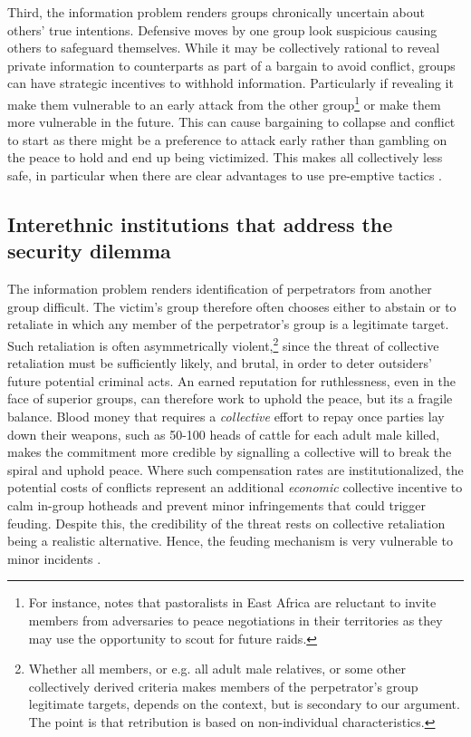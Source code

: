 Third, the information problem renders groups chronically uncertain about
others’ true intentions. Defensive moves by one group look suspicious causing
others to safeguard themselves. While it may be collectively rational to reveal
private information to counterparts as part of a bargain to avoid conflict,
groups can have strategic incentives to withhold information. Particularly if
revealing it make them vulnerable to an early attack from the other
group\footnote{For instance, \citet{Eaton_2008} notes that pastoralists in East
	Africa are reluctant to invite members from adversaries to peace
negotiations in their territories as they may use the opportunity to scout for
future raids.} or make them more vulnerable in the future. This can cause
bargaining to collapse and conflict to start as there might be a preference to
attack early rather than gambling on the peace to hold and end up being
victimized. This makes all collectively less safe, in particular when there are
clear advantages to use pre-emptive tactics \citep[53]{Lake_1996}.

\subsection{Interethnic institutions that address the security dilemma} 
\label{Interethnic institutions that address the security dilemma}

The information problem renders identification of perpetrators from another
group difficult. The victim's group therefore often chooses either to abstain or
to retaliate in which any member of the perpetrator's group is a legitimate
target. Such retaliation is often asymmetrically violent,\footnote{ Whether all
	members, or e.g. all adult male relatives, or some other collectively
	derived criteria makes members of the perpetrator’s group legitimate
	targets, depends on the context, but is secondary to our argument. The
point is that retribution is based on non-individual characteristics.} since the
threat of collective retaliation must be sufficiently likely, and brutal, in
order to deter outsiders' future potential criminal acts. An earned reputation
for ruthlessness, even in the face of superior groups, can therefore work to
uphold the peace, but its a fragile balance. Blood money that requires a
\textit{collective} effort to repay once parties lay down their weapons, such as
50-100 heads of cattle for each adult male killed, makes the commitment more
credible by signalling a collective will to break the spiral and uphold peace.
Where such compensation rates are institutionalized, the potential costs of
conflicts represent an additional \textit{economic} collective incentive to calm
in-group hotheads and prevent minor infringements that could trigger feuding.
Despite this, the credibility of the threat rests on collective retaliation
being a realistic alternative. Hence, the feuding mechanism is very vulnerable
to minor incidents \citep{Fearon_1996}.

